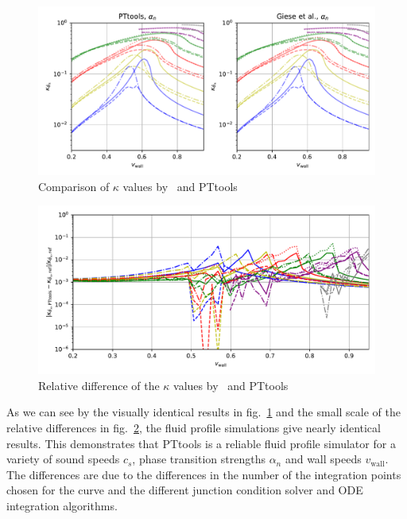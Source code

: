 \begin{figure}[ht!]
\centering
\includegraphics[width=\textwidth]{fig/giese_lisa_fig2_alpha_n.pdf}
\caption{Comparison of $\kappa$ values by~\cite[fig. 2]{giese_2021} and PTtools}
\label{fig:kappa_giese}
\end{figure}

\begin{figure}[ht!]
\centering
\includegraphics[width=\textwidth]{fig/giese_lisa_fig2_alpha_n_diff.pdf}
\caption{Relative difference of the $\kappa$ values by~\cite[fig. 2]{giese_2021} and PTtools}
\label{fig:kappa_giese_diff}
\end{figure}

As we can see by the visually identical results in fig.~\ref{fig:kappa_giese}
and the small scale of the relative differences in fig.~\ref{fig:kappa_giese_diff},
the fluid profile simulations give nearly identical results.
This demonstrates that PTtools is a reliable fluid profile simulator for a variety of
sound speeds $c_s$, phase transition strengths $\alpha_n$ and wall speeds $v_\text{wall}$.
The differences are due to the differences in the number of the integration points chosen for the curve
and the different junction condition solver and ODE integration algorithms.

